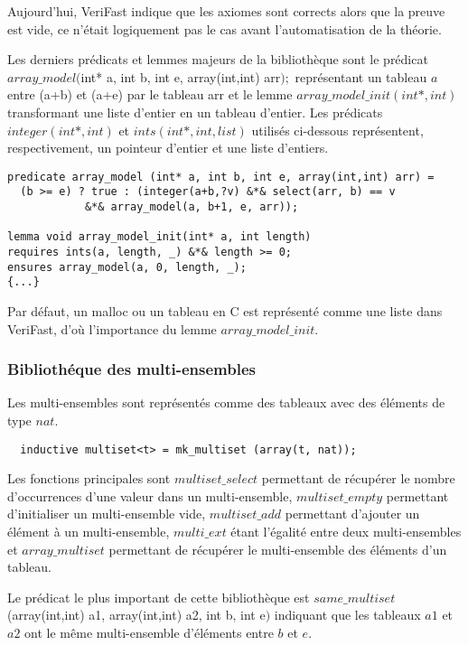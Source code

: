 \documentclass[11pt,openany]{article}
\newcommand{\verifast}{VeriFast}
\begin{document}
			Aujourd'hui, \verifast{} indique que les axiomes sont corrects alors que la preuve est vide, ce n'\'etait logiquement pas le cas avant l'automatisation de la th\'eorie.
			
			Les derniers pr\'edicats et lemmes majeurs de la biblioth\`eque sont le pr\'edicat $array\_model($int* a, int b, int e, array(int,int) arr$);$ repr\'esentant un tableau $a$ entre (a+b) et (a+e) par le tableau arr et le lemme $array\_model\_init(int*,int)$ transformant une liste d'entier en un tableau d'entier. Les pr\'edicats $integer(int*,int)$ et $ints(int*,int,list)$ utilis\'es ci-dessous repr\'esentent, respectivement, un pointeur d'entier et une liste d'entiers.
			\begin{lstlisting}
predicate array_model (int* a, int b, int e, array(int,int) arr) =
  (b >= e) ? true : (integer(a+b,?v) &*& select(arr, b) == v 
  			&*& array_model(a, b+1, e, arr));
  			
lemma void array_model_init(int* a, int length)
requires ints(a, length, _) &*& length >= 0;
ensures array_model(a, 0, length, _);
{...}

			\end{lstlisting}
			
			Par d\'efaut, un malloc ou un tableau en C est repr\'esent\'e comme une liste dans \verifast, d'o\`u l'importance du lemme $array\_model\_init$.
			\subsubsection{Biblioth\'eque des multi-ensembles}
			Les multi-ensembles sont repr\'esent\'es comme des tableaux avec des \'el\'ements de type $nat$.
			\begin{lstlisting}
  inductive multiset<t> = mk_multiset (array(t, nat));
			\end{lstlisting}
			Les fonctions principales sont $multiset\_select$ permettant de r\'ecup\'erer le nombre d'occurrences d'une valeur dans un multi-ensemble, $multiset\_empty$ permettant d'initialiser un multi-ensemble vide, $multiset\_add$ permettant d'ajouter un \'el\'ement \`a un multi-ensemble, $multi\_ext$ \'etant l'\'egalit\'e entre deux multi-ensembles et $array\_multiset$ permettant de r\'ecup\'erer le multi-ensemble des \'el\'ements d'un tableau.
			
			Le pr\'edicat le plus important de cette biblioth\`eque est $same\_multiset$(array(int,int) a1, array(int,int) a2, int b, int e$)$ indiquant que les tableaux $a1$ et $a2$ ont le m\^eme multi-ensemble d'\'el\'ements entre $b$ et $e$.
			
\end{document}
